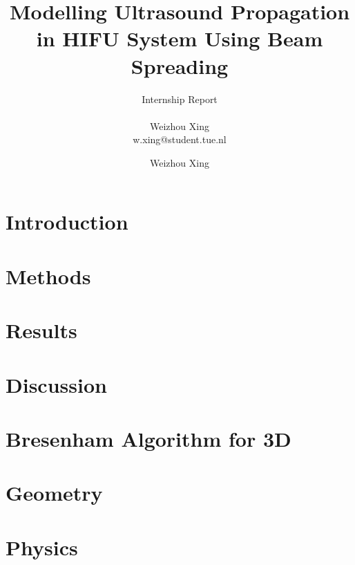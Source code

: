 \documentclass[12pt,a4paper]{report}
\title{Modelling Ultrasound Propagation in HIFU System Using Beam Spreading}
\subtitle{Internship Report \\~\\ \small{Weizhou Xing \\ \small{w.xing@student.tue.nl}}}
\author{Weizhou Xing}
\begin{document}
\maketitle
\tableofcontents



\chapter{Introduction}


\chapter{Methods}


\chapter{Results}


\chapter{Discussion}


\begin{appendices}
\chapter{Bresenham Algorithm for 3D}

\chapter{Geometry}

\chapter{Physics}

\end{appendices}

\printbibliography[
heading=bibintoc,
title={References}
] %

\clearpage
\end{document}
